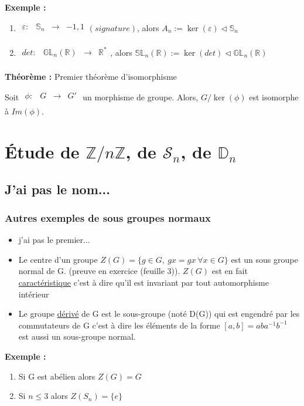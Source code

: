 \documentclass{report}
\newenvironment{exemple}{\begin{tcolorbox}[colback=gray!10,colframe= white]
    \textbf{Exemple :}
     \par}
    {\end{tcolorbox}}
\newenvironment{theoreme}[1][]{
    \begin{tcolorbox}[]
    \textbf{Théorème :} #1  \par} 
    {\end{tcolorbox}}
\newcommand{\fctsarg}[3]{
    \begin{array}{lrcl}
    #1: & #2 & \longrightarrow & #3 \\
    \end{array}
}
\newcommand{\Z}{\mathbb{Z}}
\newcommand{\R}{\mathbb{R}}
\newcommand{\znz}{\Z/n\Z}
\newcommand{\sn}{\mathcal{S}_{n}}
\newcommand{\dsp}{\displaystyle}
\begin{document}
\begin{exemple}
    \begin{enumerate}
        \item $\fctsarg{\varepsilon}{\mathbb{S}_n}{-1,1} (signature)$, alors $A_n := \ker(\varepsilon) \triangleleft \mathbb{S}_n$
        \item $\fctsarg{det}{\mathbb{GL}_n(\R)}{\R^*}$, alors $\mathbb{SL}_n(\R) := \ker(det) \triangleleft \mathbb{GL}_n(\R)$
    \end{enumerate}
\end{exemple}

\begin{theoreme}[Premier théorème d'isomorphisme]
    Soit $\fctsarg{\phi}{G}{G'}$ un morphisme de groupe. Alors, $G/\ker(\phi)$ est isomorphe à $Im(\phi)$.
\end{theoreme}

\chapter{\texorpdfstring{Étude de $\znz$, de $\sn$, de $\mathbb{D}_{n}$}{Etude de Z/nZ, Sn, Dn}}

\section{J'ai pas le nom...}




\subsection{Autres exemples de sous groupes normaux}

\begin{itemize}
\item j'ai pas le premier...
\item Le centre d'un groupe $\dsp Z(G)=\{g\in G,~gx=gx~\forall x\in G\}$ est un sous groupe normal de G. (preuve en exercice (feuille 3)). $Z(G)$ est en fait \underline{caractéristique} c'est à dire qu'il est invariant par tout automorphisme intérieur
\item Le groupe \underline{dérivé} de G est le sous-groupe (noté D(G)) qui est engendré par les commutateurs de G c'est à dire les éléments de la forme $[a,b]=aba^{-1}b^{-1}$ est aussi un sous-groupe normal.
\end{itemize}

\begin{exemple}
    \begin{enumerate}
        \item Si G est abélien alors $Z(G)=G$
        \item Si $n\leq3$ alors $Z(S_{n})=\{e\}$
    \end{enumerate}
\end{exemple}
\end{document}
